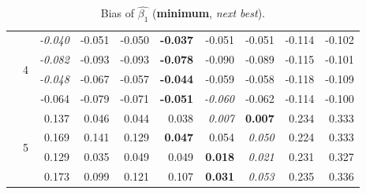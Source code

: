 \documentclass[authoryear, review, 11pt]{elsarticle}
\begin{document}
\begin{table}
\begin{center}
{\begin{tabular}{ccrrrrrrrr}
  \cline{3-10}
   & \multirow{4}{*}{4} & \emph{-0.040} & -0.051 & -0.050 & \textbf{-0.037} & -0.051 & -0.051 & -0.114 & -0.102 \\ 
   &  & \emph{-0.082} & -0.093 & -0.093 & \textbf{-0.078} & -0.090 & -0.089 & -0.115 & -0.101 \\ 
   &  & \emph{-0.048} & -0.067 & -0.057 & \textbf{-0.044} & -0.059 & -0.058 & -0.118 & -0.109 \\ 
   &  & -0.064 & -0.079 & -0.071 & \textbf{-0.051} & \emph{-0.060} & -0.062 & -0.114 & -0.100 \\ 
  \cline{3-10}
   & \multirow{4}{*}{5} & 0.137 & 0.046 & 0.044 & 0.038 & \emph{0.007} & \textbf{0.007} & 0.234 & 0.333 \\ 
   &  & 0.169 & 0.141 & 0.129 & \textbf{0.047} & 0.054 & \emph{0.050} & 0.224 & 0.333 \\ 
   &  & 0.129 & 0.035 & 0.049 & 0.049 & \textbf{0.018} & \emph{0.021} & 0.231 & 0.327 \\ 
   &  & 0.173 & 0.099 & 0.121 & 0.107 & \textbf{0.031} & \emph{0.053} & 0.235 & 0.336 \\ 
  \end{tabular}}
\caption{Bias of $\hat{\beta_1}$ (\textbf{minimum}, \emph{next best}).\label{table:X1-bias}}
		\end{center}
		\end{table}	

		
		
\end{document}
